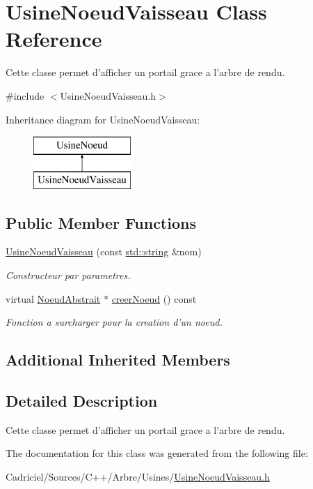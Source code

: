 \hypertarget{class_usine_noeud_vaisseau}{\section{Usine\-Noeud\-Vaisseau Class Reference}
\label{class_usine_noeud_vaisseau}
}


Cette classe permet d'afficher un portail grace a l'arbre de rendu.  




{\ttfamily \#include $<$Usine\-Noeud\-Vaisseau.\-h$>$}

Inheritance diagram for Usine\-Noeud\-Vaisseau\-:\begin{figure}[H]
\begin{center}
\leavevmode
\includegraphics[height=2.000000cm]{class_usine_noeud_vaisseau}
\end{center}
\end{figure}
\subsection*{Public Member Functions}
\begin{DoxyCompactItemize}
\item 
\hyperlink{group__inf2990_ga45efed55da2886bd5f555d2564bed0b0}{Usine\-Noeud\-Vaisseau} (const \hyperlink{glew_8h_ae84541b4f3d8e1ea24ec0f466a8c568b}{std\-::string} \&nom)
\begin{DoxyCompactList}\small\item\em Constructeur par parametres. \end{DoxyCompactList}\item 
virtual \hyperlink{class_noeud_abstrait}{Noeud\-Abstrait} $\ast$ \hyperlink{group__inf2990_ga90b6c05544585681ba62e468ad958dae}{creer\-Noeud} () const 
\begin{DoxyCompactList}\small\item\em Fonction a surcharger pour la creation d'un noeud. \end{DoxyCompactList}\end{DoxyCompactItemize}
\subsection*{Additional Inherited Members}


\subsection{Detailed Description}
Cette classe permet d'afficher un portail grace a l'arbre de rendu. 

The documentation for this class was generated from the following file\-:\begin{DoxyCompactItemize}
\item 
Cadriciel/\-Sources/\-C++/\-Arbre/\-Usines/\hyperlink{_usine_noeud_vaisseau_8h}{Usine\-Noeud\-Vaisseau.\-h}\end{DoxyCompactItemize}
